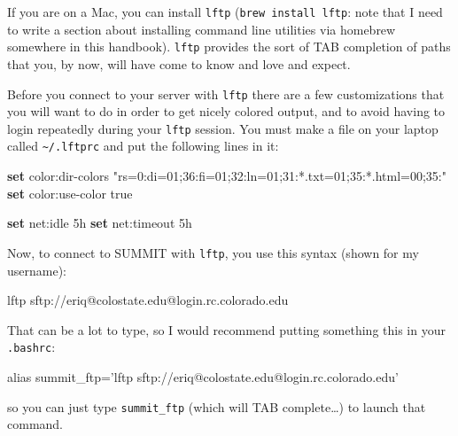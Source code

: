\documentclass[]{krantz}
\makeatletter
\newenvironment{Shaded}{\begin{snugshade}}{\end{snugshade}}
\newcommand{\BuiltInTok}[1]{#1}
\newcommand{\ExtensionTok}[1]{#1}
\newcommand{\KeywordTok}[1]{\textcolor[rgb]{0.27,0.27,0.27}{\textbf{#1}}}
\newcommand{\NormalTok}[1]{#1}
\newcommand{\StringTok}[1]{\textcolor[rgb]{0.5,0.5,0.5}{#1}}
\newenvironment{kframe}{%
\medskip{}
\setlength{\fboxsep}{.8em}
 \def\at@end@of@kframe{}%
 \ifinner\ifhmode%
  \def\at@end@of@kframe{\end{minipage}}%
  \begin{minipage}{\columnwidth}%
 \fi\fi%
 \def\FrameCommand##1{\hskip\@totalleftmargin \hskip-\fboxsep
 \colorbox{shadecolor}{##1}\hskip-\fboxsep
     \hskip-\linewidth \hskip-\@totalleftmargin \hskip\columnwidth}%
 \MakeFramed {\advance\hsize-\width
   \@totalleftmargin\z@ \linewidth\hsize
   \@setminipage}}%
 {\par\unskip\endMakeFramed%
 \at@end@of@kframe}
\renewenvironment{Shaded}{\begin{kframe}}{\end{kframe}}
\makeatother
\begin{document}
If you are on a Mac, you can install \texttt{lftp} (\texttt{brew\ install\ lftp}: note that I need to write
a section about installing command line utilities via homebrew somewhere in this handbook).
\texttt{lftp} provides the sort of TAB completion of paths that you, by now, will have come to
know and love and expect.

Before you connect to your server with \texttt{lftp} there are a few customizations that you will
want to do in order to get nicely colored output, and to avoid having to login repeatedly
during your \texttt{lftp} session. You must make a file on your laptop called \texttt{\textasciitilde{}/.lftprc} and put
the following lines in it:

\begin{Shaded}
\begin{Highlighting}[]
\KeywordTok{set} \ExtensionTok{color}\NormalTok{:dir-colors }\StringTok{"rs=0:di=01;36:fi=01;32:ln=01;31:*.txt=01;35:*.html=00;35:"}
\KeywordTok{set} \ExtensionTok{color}\NormalTok{:use-color true}

\KeywordTok{set} \ExtensionTok{net}\NormalTok{:idle 5h}
\KeywordTok{set} \ExtensionTok{net}\NormalTok{:timeout 5h}
\end{Highlighting}
\end{Shaded}

Now, to connect to SUMMIT with \texttt{lftp}, you use this syntax (shown for my username):

\begin{Shaded}
\begin{Highlighting}[]
\ExtensionTok{lftp}\NormalTok{ sftp://eriq@colostate.edu@login.rc.colorado.edu}
\end{Highlighting}
\end{Shaded}

That can be a lot to type, so I would recommend putting something this in your
\texttt{.bashrc}:

\begin{Shaded}
\begin{Highlighting}[]
\BuiltInTok{alias}\NormalTok{ summit_ftp=}\StringTok{'lftp sftp://eriq@colostate.edu@login.rc.colorado.edu'}
\end{Highlighting}
\end{Shaded}

so you can just type \texttt{summit\_ftp} (which will TAB complete\ldots{}) to launch that command.
\end{document}
